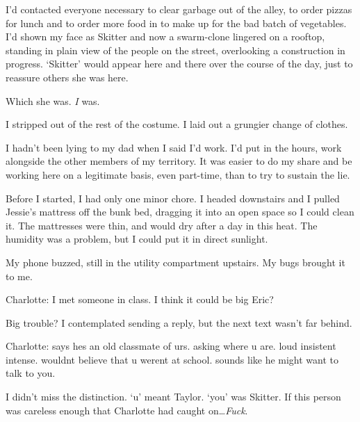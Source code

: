 I'd contacted everyone necessary to clear garbage out of the alley, to order pizzas for lunch and to order more food in to make up for the bad batch of vegetables.  I'd shown my face as Skitter and now a swarm-clone lingered on a rooftop, standing in plain view of the people on the street, overlooking a construction in progress.  `Skitter' would appear here and there over the course of the day, just to reassure others she was here.



Which she was.  \emph{I }was.



I stripped out of the rest of the costume.  I laid out a grungier change of clothes.



I hadn't been lying to my dad when I said I'd work.  I'd put in the hours, work alongside the other members of my territory.  It was easier to do my share and be working here on a legitimate basis, even part-time, than to try to sustain the lie.



Before I started, I had only one minor chore.  I headed downstairs and I pulled Jessie's mattress off the bunk bed, dragging it into an open space so I could clean it.  The mattresses were thin, and would dry after a day in this heat.  The humidity was a problem, but I could put it in direct sunlight.



My phone buzzed, still in the utility compartment upstairs.  My bugs brought it to me.



Charlotte:
I met someone in class.  I think it could be big Eric?



Big trouble?  I contemplated sending a reply, but the next text wasn't far behind.



Charlotte:
says hes an old classmate of urs.  asking where u are.  loud insistent intense.  wouldnt believe that u werent at school.  sounds like he might want to talk to you.



I didn't miss the distinction.  `u' meant Taylor.  `you' was Skitter.  If this person was careless enough that Charlotte had caught on\ldots \emph{Fuck}.





